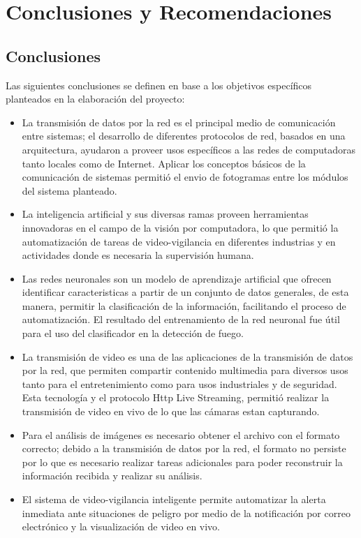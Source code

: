 \chapter{Conclusiones y Recomendaciones}
\section{Conclusiones}
Las siguientes conclusiones se definen en base a los objetivos específicos planteados en la elaboración del proyecto:\\

\begin{itemize}
    \item La transmisión de datos por la red es el principal medio de comunicación entre sistemas; el desarrollo de diferentes protocolos de red, basados en una arquitectura, ayudaron a proveer usos específicos a las redes de computadoras tanto locales como de Internet. Aplicar los conceptos básicos de la comunicación de sistemas permitió el envio de fotogramas entre los módulos del sistema planteado.
    
    \item La inteligencia artificial y sus diversas ramas proveen herramientas innovadoras en el campo de la visión por computadora, lo que permitió la automatización de tareas de video-vigilancia en diferentes industrias y en actividades donde es necesaria la supervisión humana.
    
    \item Las redes neuronales son un modelo de aprendizaje artificial que ofrecen identificar caracteristicas a partir de un conjunto de datos generales, de esta manera, permitir la clasificación de la información, facilitando el proceso de automatización. El resultado del entrenamiento de la red neuronal fue útil para el uso del clasificador en la detección de fuego.
    
    \item La transmisión de video es una de las aplicaciones de la transmisión de datos por la red, que permiten compartir contenido multimedia para diversos usos tanto para el entretenimiento como para usos industriales y de seguridad. Esta tecnología y el protocolo Http Live Streaming, permitió realizar la transmisión de video en vivo de lo que las cámaras estan capturando.
    
    \item Para el análisis de imágenes es necesario obtener el archivo con el formato correcto; debido a la transmisión de datos por la red, el formato no persiste por lo que es necesario realizar tareas adicionales para poder reconstruir la información recibida y realizar su análisis.
    
    \item El sistema de video-vigilancia inteligente permite automatizar la alerta inmediata ante situaciones de peligro por medio de la notificación por correo electrónico y la visualización de video en vivo.
\end{itemize}

